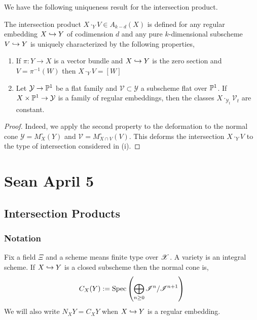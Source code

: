 \documentclass[12pt]{article}
\begin{document}
\begin{rmk}
We have the following uniqueness result for the intersection product.
\end{rmk}

\begin{prop}
The intersection product $X \cdot_Y V \in A_{k-d}(X)$ is defined for any regular embedding $X \embed Y$ of codimension $d$ and any pure $k$-dimensional subscheme $V \embed Y$ is uniquely characterized by the following properties,
\begin{enumerate}
\item If $\pi : Y \to X$ is a vector bundle and $X \embed Y$ is the zero section and $V = \pi^{-1}(W)$ then $X \cdot_Y V = [W]$

\item Let $\mathcal{Y} \to \P^1$ be a flat family and $\mathcal{V} \subset \mathcal{Y}$ a subscheme flat over $\P^1$. If $X \times \P^1 \to \mathcal{Y}$ is a family of regular embeddings, then the classes $X \cdot_{\mathcal{Y}_t} \mathcal{V}_t$ are constant. 
\end{enumerate}
\end{prop}

\begin{proof}
Indeed, we apply the second property to the deformation to the normal cone $\mathcal{Y} = M_X^\circ(Y)$ and $\mathcal{V} = M^\circ_{X \cap V}(V)$. This deforms the intersection $X \cdot_Y V$ to the type of intersection considered in (i). 
\end{proof}

\section{Sean April 5}

\subsection{Intersection Products}

\subsubsection{Notation}

Fix a field $\Xi$ and a scheme means finite type over $\X$. A variety is an integral scheme. If $X \embed Y$ is a closed subscheme then the normal cone is,
\[ C_X(Y) := \Spec{\bigoplus_{n \ge 0} \I^n / \I^{n+1}} \]
We will also write $N_X Y = C_X Y$ when $X \embed Y$ is a regular embedding.
\end{document}
